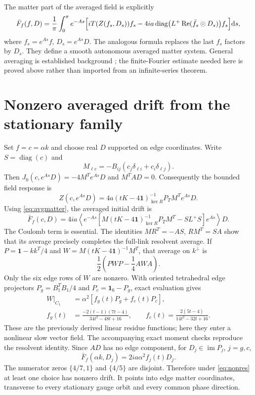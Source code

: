 \documentclass[11pt,a4paper]{article}
\newcommand{\id}{\mathbf1}\newcommand{\dd}{\mathrm d}\newcommand{\diag}{\operatorname{diag}}
\begin{document}
The matter part of the averaged field is explicitly
\begin{align}
\bar F_f(f,D)=\frac1\pi\int_0^\pi e^{-As}\Bigl[
iT(Z(f_s,D_s))f_s
-4ia\diag\bigl(L^+\Rea(\bar f_s\odot D_s)\bigr)f_s\Bigr]\dd s,\label{eq:avgmatter}
\end{align}
where $f_s=e^{As}f$, $D_s=e^{As}D$. The analogous formula replaces the last $f_s$ factors by $D_s$. They define a smooth autonomous averaged matter system. General averaging is established background \cite{Dumas}; the finite-Fourier estimate needed here is proved above rather than imported from an infinite-series theorem.

\newpage
\section{Nonzero averaged drift from the stationary family}
Set $f=c=\alpha k$ and choose real $D$ supported on edge coordinates. Write $S=\diag(c)$ and
\[
M_{\ell e}=-B_{ij}(c_j\delta_{\ell i}+c_i\delta_{\ell j}).
\]
Then $J_0(c,e^{As}D)=-4M^Te^{As}D$ and $M^TAD=0$. Consequently the bounded field response is
\[
Z(c,e^{As}D)=4a(tK-4\id)^{-1}_{\ker R}P_TM^Te^{As}D.
\]
Using \eqref{eq:avgmatter}, the averaged initial drift is
\begin{equation}
\bar F_f(c,D)=4ia\left\langle e^{-As}
\left[M(tK-4\id)^{-1}_{\ker R}P_TM^T-SL^+S\right]e^{As}\right\rangle D.
\end{equation}
The Coulomb term is essential. The identities $MR^T=-AS$, $RM^T=SA$ show that its average precisely completes the full-link resolvent average. If $P=\id-kk^T/4$ and $W=M(tK-4\id)^{-1}M^T$, that average on $k^\perp$ is
\[
\frac12\left(PWP-\frac14AWA\right).
\]
Only the six edge rows of $W$ are nonzero. With oriented tetrahedral edge projectors $P_g=B_1^TB_1/4$ and $P_c=\id_6-P_g$, exact evaluation gives
\begin{align}
W\big|_{C_1}&=\alpha^2[f_g(t)P_g+f_c(t)P_c],\\
f_g(t)&=\frac{-2(t-1)(7t-4)}{34t^2-48t+16},\qquad
f_c(t)=\frac{2(5t-4)}{14t^2-32t+16}.
\end{align}
These are the previously derived linear residue functions; here they enter a nonlinear slow vector field. The accompanying exact moment checks reproduce the resolvent identity. Since $AD$ has no edge component, for $D_j\in\operatorname{im}P_j$, $j=g,c$,
\begin{equation}
\boxed{\bar F_f(\alpha k,D_j)=2ia\alpha^2 f_j(t)D_j.}\label{eq:drift}
\end{equation}
The numerator zeros $\{4/7,1\}$ and $\{4/5\}$ are disjoint. Therefore under \eqref{eq:nonres} at least one choice has nonzero drift. It points into edge matter coordinates, transverse to every stationary gauge orbit and every common phase direction.
\end{document}

